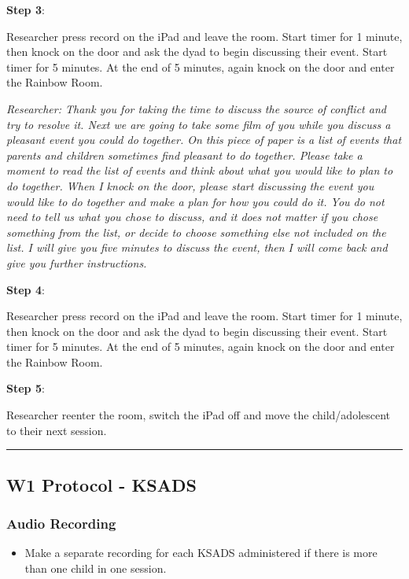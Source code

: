 \documentclass[]{book}
\providecommand{\tightlist}{%
  \setlength{\itemsep}{0pt}\setlength{\parskip}{0pt}}
\begin{document}
\textbf{Step 3}:

Researcher press record on the iPad and leave the room. Start timer for 1 minute, then knock on the door and ask the dyad to begin discussing their event. Start timer for 5 minutes. At the end of 5 minutes, again knock on the door and enter the Rainbow Room.

\emph{Researcher: Thank you for taking the time to discuss the source of conflict and try to resolve it. Next we are going to take some film of you while you discuss a pleasant event you could do together. On this piece of paper is a list of events that parents and children sometimes find pleasant to do together. Please take a moment to read the list of events and think about what you would like to plan to do together. When I knock on the door, please start discussing the event you would like to do together and make a plan for how you could do it. You do not need to tell us what you chose to discuss, and it does not matter if you chose something from the list, or decide to choose something else not included on the list. I will give you five minutes to discuss the event, then I will come back and give you further instructions.}

\textbf{Step 4}:

Researcher press record on the iPad and leave the room. Start timer for 1 minute, then knock on the door and ask the dyad to begin discussing their event. Start timer for 5 minutes. At the end of 5 minutes, again knock on the door and enter the Rainbow Room.

\textbf{Step 5}:

Researcher reenter the room, switch the iPad off and move the child/adolescent to their next session.

\begin{center}\rule{0.5\linewidth}{0.5pt}\end{center}

\hypertarget{w1-protocol---ksads}{%
\subsection{W1 Protocol - KSADS}\label{w1-protocol---ksads}}

\hypertarget{audio-recording}{%
\subsubsection{Audio Recording}\label{audio-recording}}

\begin{itemize}
\tightlist
\item
  Make a separate recording for each KSADS administered if there is more than one child in one session.
\end{itemize}
\end{document}
